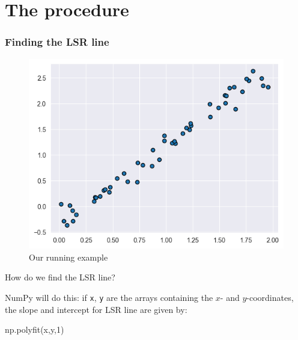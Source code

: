 \documentclass{beamer}
\newenvironment{codeblock}
    {\hfill\begin{beamerboxesrounded}[lower=codecol, width=0.8\textwidth]
    \medskip

    }
    { 
    \end{beamerboxesrounded}\hfill
    }
\theoremstyle{example}
\newcommand{\ct}[1]{\lstinline[language=Python,basicstyle=\ttfamily\footnotesize,stringstyle=\small\color{strings}]!#1!}
\begin{document}
\section{The procedure}

\begin{frame}[fragile]
\frametitle{Finding the LSR line}
\begin{figure}\label{fig:running-example}
\includegraphics[height=0.4\textheight]{example1.png}
\caption{Our running example}
\end{figure}

\vspace*{-6pt}
How do we find the LSR line?

\pause
NumPy will do this:  if \ct{x}, \ct{y} are the arrays containing the $x$- and $y$-coordinates, the slope and intercept for LSR line are given by:


\begin{codeblock}

\begin{python}[numbers=none]
np.polyfit(x,y,1)
\end{python}

\end{codeblock}

\end{frame}
\end{document}
